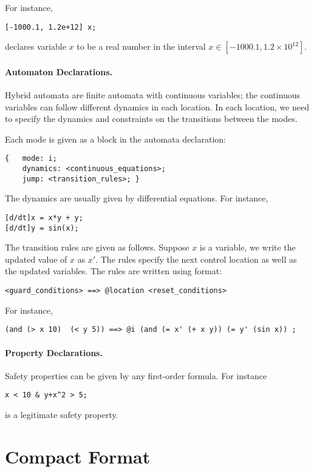 \documentclass[envcountsect]{llncs}
\begin{document}
For instance,
\begin{verbatim}
[-1000.1, 1.2e+12] x;
\end{verbatim}
declares variable $x$ to be a real number in the interval $x\in [-1000.1,
1.2\times 10^{12}].$

\paragraph{Automaton Declarations.}

Hybrid automata are finite automata with continuous variables; the continuous
variables can follow different dynamics in each location. In each location, we
need to specify the dynamics and constraints on the transitions between the
modes. 

Each mode is given as a block in the automata declaration:
\begin{verbatim}
{  	mode: i;
    dynamics: <continuous_equations>;
    jump: <transition_rules>; }
\end{verbatim}
The dynamics are usually given by differential equations. For instance,
\begin{verbatim}
[d/dt]x = x*y + y;
[d/dt]y = sin(x);
\end{verbatim}
The transition rules are given as follows. Suppose $x$ is a variable, we write
the updated value of $x$ as $x'$. The rules specify the next control location as
well as the updated variables. The rules are written using format:
\begin{verbatim}
<guard_conditions> ==> @location <reset_conditions>
\end{verbatim}
For instance,
\begin{verbatim}
(and (> x 10)  (< y 5)) ==> @i (and (= x' (+ x y)) (= y' (sin x)) ; 
\end{verbatim}

\paragraph{Property Declarations.}

Safety properties can be given by any first-order formula. For instance
\begin{verbatim}
x < 10 & y+x^2 > 5;
\end{verbatim}
is a legitimate safety property. 

\newpage

\section{Compact Format}
\end{document}
